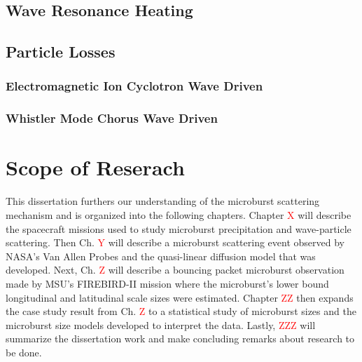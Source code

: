 \subsection{Wave Resonance Heating}\label{Intro:wave_heating}

\subsection{Particle Losses}\label{Intro:acceleration}

\subsubsection{Electromagnetic Ion Cyclotron Wave Driven}\label{Intro:emic_scattering}

\subsubsection{Whistler Mode Chorus Wave Driven}\label{Intro:chorus_scattering}

\section{Scope of Reserach}\label{Intro:scope}
This dissertation furthers our understanding of the microburst scattering mechanism and is organized into the following chapters. Chapter \textcolor{red}{X} will describe the spacecraft missions used to study microburst precipitation and wave-particle scattering. Then Ch. \textcolor{red}{Y} will describe a microburst scattering event observed by NASA's Van Allen Probes and the quasi-linear diffusion model that was developed. Next, Ch. \textcolor{red}{Z} will describe a bouncing packet microburst observation made by MSU's FIREBIRD-II mission where the microburst's lower bound longitudinal and latitudinal scale sizes were estimated. Chapter \textcolor{red}{ZZ} then expands the case study result from Ch. \textcolor{red}{Z} to a statistical study of microburst sizes and the microburst size models developed to interpret the data. Lastly, \textcolor{red}{ZZZ} will summarize the dissertation work and make concluding remarks about research to be done.